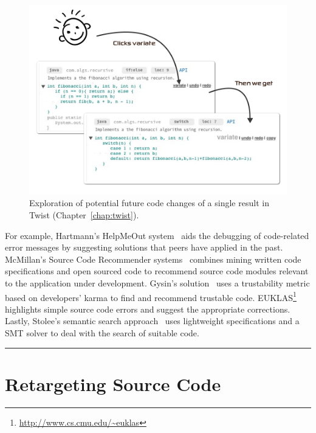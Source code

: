 \begin{figure}[!ht]
    \centering
    \includegraphics[width=\textwidth]{images/basealternative}
    \caption{Exploration of potential future code changes of a single result in Twist (Chapter~\ref{chap:twist}).}
    \label{fig:basealternative}
\end{figure}

For example, Hartmann's HelpMeOut system~\cite{Hartmann:2010hx} aids the debugging of code-related error messages by suggesting solutions that peers have applied in the past. McMillan's Source Code Recommender systems~\cite{McMillan:2012dj} combines mining written code specifications and open sourced code to recommend source code modules relevant to the application under development. Gysin's solution~\cite{Gysin:2010kt} uses a trustability metric based on developers' karma to find and recommend trustable code. EUKLAS\footnote{\url{http://www.cs.cmu.edu/~euklas}} highlights simple source code errors and suggest the appropriate corrections. Lastly, Stolee's semantic search approach~\cite{Stolee:2012wp} uses lightweight specifications and a SMT solver to deal with the search of suitable code.  


\fancybreak{\pfbreakdisplay}

\section{Retargeting Source Code}
\label{sec:retargetingcode}

